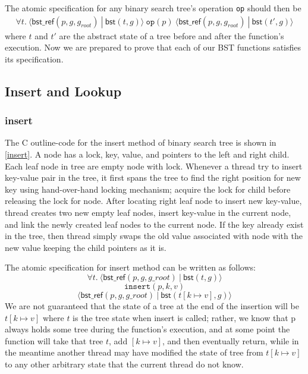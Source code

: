 \documentclass[acmsmall,screen]{acmart}\settopmatter{printfolios=true}
\newcommand{\treerep}{\ensuremath{\mathsf{bst}}}
\newcommand{\nodeboxrep}{\ensuremath{\mathsf{bst\_ref}}}
\begin{document}
The atomic specification for any binary search tree's operation \texttt{op} should then be
\begin{align*}\forall t.\ \langle \nodeboxrep(p,g,g_{\mathit{root}})\ |\ \treerep(t,g)\rangle\ \texttt{op}(p)\ \langle \nodeboxrep(p,g,g_{\mathit{root}})\ |\ \treerep(t', g)\rangle
\end{align*}
where $t$ and $t'$ are the abstract state of a tree before and after the function's execution. Now we are prepared to prove that each of our BST functions satisfies its specification.

\subsection{Insert and Lookup}

\subsubsection{insert}
The C outline-code for the insert method of binary search tree is shown in \ref{insert}. A node has a lock, key, value, and pointers to the left and right child. Each leaf node in tree are empty node with lock. Whenever a thread try to insert key-value pair in the tree, it first spans the tree to find the right position for new key using hand-over-hand locking mechanism; acquire the lock for child before releasing the lock for node. After locating right leaf node to insert new key-value, thread creates two new empty leaf nodes, insert key-value in the current node, and link the newly created leaf nodes to the current node. If the key already exist in the tree, then thread simply swaps the old value associated with node with the new value keeping the child pointers as it is.

The atomic specification for insert method can be written as follows:
$$\forall t.\ \langle \nodeboxrep(p,g,g\_root)\ |\ \treerep(t,g)\rangle $$ 
$$\texttt{insert}(p,k,v)$$
$$\langle \nodeboxrep(p,g,g\_root)\ |\ \treerep(t[k\mapsto v],g)\rangle $$
We are not guaranteed that the state of  a tree at the end of the insertion will be $t[k\mapsto v]$ where $t$ is the tree state when insert is called; rather, we know that p always holds some tree during the function's execution, and at some point the function will take that tree $t$, add $[k\mapsto v]$, and then eventually return, while in the meantime another thread may have modified the state of tree from $t[k\mapsto v]$ to any other arbitrary state that the current thread do not know.
\end{document}
